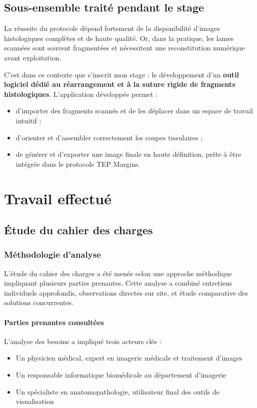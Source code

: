\documentclass[12pt,a4paper]{report}
\begin{document}
\section{Sous-ensemble traité pendant le stage}

La réussite du protocole dépend fortement de la disponibilité d'images histologiques complètes et de haute qualité. Or, dans la pratique, les lames scannées sont souvent fragmentées et nécessitent une reconstitution numérique avant exploitation.

C'est dans ce contexte que s'inscrit mon stage : le développement d'un \textbf{outil logiciel dédié au réarrangement et à la suture rigide de fragments histologiques}. L'application développée permet :

\begin{itemize}
\item d'importer des fragments scannés et de les déplacer dans un espace de travail intuitif ;
\item d'orienter et d'assembler correctement les coupes tissulaires ;
\item de générer et d'exporter une image finale en haute définition, prête à être intégrée dans le protocole TEP Margins.
\end{itemize}

\chapter{Travail effectué}

\section{Étude du cahier des charges}

\subsection{Méthodologie d'analyse}

L'étude du cahier des charges a été menée selon une approche méthodique impliquant plusieurs parties prenantes. Cette analyse a combiné entretiens individuels approfondis, observations directes sur site, et étude comparative des solutions concurrentes.

\subsubsection{Parties prenantes consultées}

L'analyse des besoins a impliqué trois acteurs clés :
\begin{itemize}
\item Un physicien médical, expert en imagerie médicale et traitement d'images
\item Un responsable informatique biomédicale au département d'imagerie
\item Un spécialiste en anatomopathologie, utilisateur final des outils de visualisation
\end{itemize}
\end{document}
